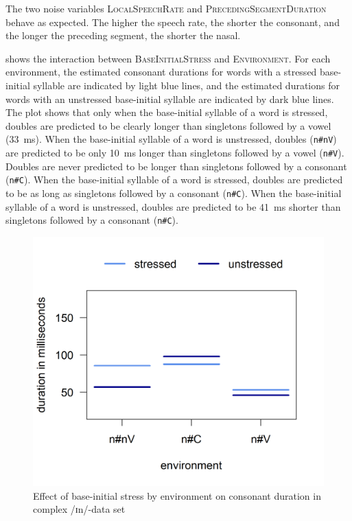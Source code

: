 The two noise variables \textsc{LocalSpeechRate} and \textsc{PrecedingSegmentDuration} behave as expected. The higher the speech rate, the shorter the consonant, and the longer the preceding segment, the shorter the nasal. 


 shows the interaction between \textsc{BaseInitialStress} and \textsc{Environment}. For each environment, the estimated consonant durations for words with a stressed base-initial syllable are indicated by light blue lines, and the estimated durations for words with an unstressed base-initial syllable are indicated by dark blue lines. 
The plot shows that only when the base-initial syllable of a word is stressed, doubles are predicted to be clearly longer than singletons followed by a vowel (33~ms). When the base-initial syllable of a word is unstressed, doubles (\texttt{n\#nV}) are predicted to be only 10~ms longer than singletons followed by a vowel (\texttt{n\#V}).
Doubles are never predicted to be longer than singletons followed by a consonant  (\texttt{n\#C}).
When the base-initial syllable of a word is stressed, doubles are predicted to be as long as singletons followed by a consonant (\texttt{n\#C}). When the base-initial syllable of a word is unstressed, doubles are predicted to be 41~ms shorter than singletons followed by a consonant (\texttt{n\#C}).




 	\begin{figure}[t!]

 		\centering
 		\includegraphics [scale=0.5] {images/Experiment/InModelInterEnvStress}
		
 		\caption{Effect of base-initial stress by environment on consonant duration in complex /ɪn/-data set}		
 		\label{fig:Env Stress In experiment}

 	\end{figure}%
 	
